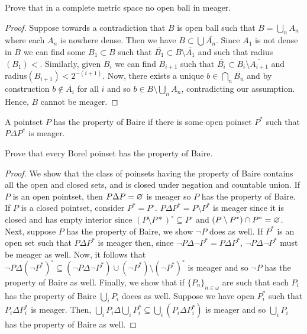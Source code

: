 
\begin{exercise}
    Prove that in a complete metric space no open ball in meager. 
\end{exercise}

\begin{proof}
    Suppose towards a contradiction that $B$ is open ball such that $B = \bigcup_n A_n$ where each $A_n$ is nowhere dense. Then we have $B \subset \bigcup \overline{A_n}$. Since $A_1$ is not dense in $B$ we can find some $B_1 \subset B$ such that $\overline{B_1} \subset B \setminus \overline{A_1}$ and such that radius$(B_1) < $. Similarly, given $B_i$ we can find $B_{i+1}$ such that $\overline{B_i} \subset B_i \setminus \overline{A_{i+1}}$ and radius$(B_{i+1})<2^{-(i+1)}$. Now, there exists a unique $b \in \bigcap_{n} \overline{B_n}$ and by construction $b \not\in \overline{A_i}$ for all $i$ and so $b \in B \setminus \bigcup_n A_n$, contradicting our assumption. Hence, $B$ cannot be meager.  
\end{proof}

\noindent
A pointset $P$ has the property of Baire if there is some open poinset $P^*$ such that $P \Delta P^*$ is meager.

\begin{exercise}
    Prove that every Borel poinset has the property of Baire. 
\end{exercise}

\begin{proof}
    We show that the class of poinsets having the property of Baire contains all the open and closed sets, and is closed under negation and countable union. If $P$ is an open pointset, then $P \Delta P = \varnothing$ is meager so $P$ has the property of Baire. If $P$ is a closed pointset, consider $P^* = P^{\circ}$. $P \Delta P^* = P \setminus P^*$ is meager since it is closed and has empty interior since $(P \setminus P*)^{\circ} \subseteq P^{\circ}$ and $(P \setminus P^*) \cap P^{\circ} = \varnothing$. Next, suppose $P$ has the property of Baire, we show $\neg P$ does as well. If $P^*$ is an open set such that $P \Delta P^*$ is meager then, since $\neg P \Delta \neg P^* = P \Delta P^*$, $\neg P \Delta \neg P^*$ must be meager as well. Now, it follows that $\neg P \Delta (\neg P^*)^{\circ} \subseteq (\neg P \Delta \neg P^*) \cup (\neg P^*)\setminus (\neg P^*)^{\circ}$ is meager and so $\neg P$ has the property of Baire as well. Finally, we show that if $\{P_n\}_{n \in \omega}$ are such that each $P_i$ has the property of Baire $\bigcup_i P_i$ doees as well. Suppose we have open $P_i^*$ such that $P_i \Delta P_i^*$ is meager. Then, $\bigcup_i P_i \Delta \bigcup_i P_i^* \subseteq \bigcup_i (P_i \Delta P_i^*)$ is meager and so $\bigcup_{i} P_i$ has the property of Baire as well.  
\end{proof}

